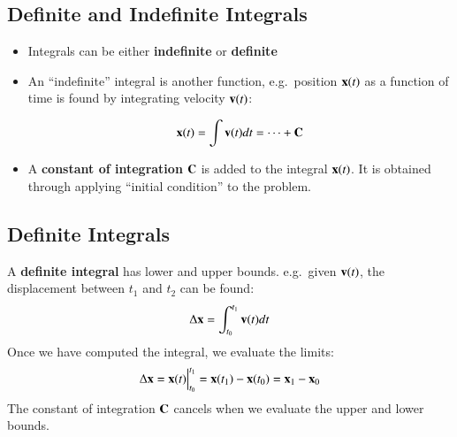 \documentclass[11pt]{article}
\newcommand{\mb}[1]{\ensuremath\mathbf{#1}}
\begin{document}
\subsection{Definite and Indefinite Integrals}

\begin{itemize}
\item Integrals can be either \textbf{indefinite} or \textbf{definite}
\item An ``indefinite'' integral is another function, e.g.\ position
  $\mb{x}(t)$ as a function of time is found by integrating velocity
  $\mb{v}(t)$:

  \begin{equation*}
    \mb{x}(t)=\int\mb{v}(t)dt=\cdots+\mb{C}
  \end{equation*}
\item A \textbf{constant of integration} $\mb{C}$ is added to the integral
  $\mb{x}(t)$. It is obtained through applying ``initial condition'' to the
  problem.
\end{itemize}


\subsection{Definite Integrals}

A \textbf{definite integral} has lower and upper bounds. e.g.\ given
$\mb{v}(t)$, the displacement between $t_1$ and $t_2$ can be found:
\begin{equation*}
  \Delta\mb{x}=\int_{t_0}^{t_1} \mb{v}(t)dt
\end{equation*}
Once we have computed the integral, we evaluate the limits:
\begin{equation*}
  \Delta\mb{x} =
  \mb{x}(t)\Big|^{t_1}_{t_0}=
  \mb{x}(t_1)-\mb{x}(t_0)=
  \mb{x}_1-\mb{x}_0
\end{equation*}
The constant of integration $\mb{C}$ cancels when we evaluate the upper and
lower bounds.
\end{document}
